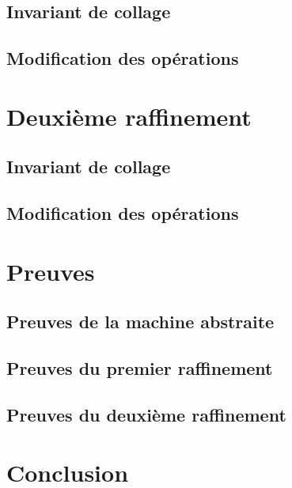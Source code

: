 \documentclass[12pt]{article}
\begin{document}
\subsection{Invariant de collage}
\subsection{Modification des opérations}
\newpage
\section{Deuxième raffinement}
\subsection{Invariant de collage}
\subsection{Modification des opérations}
\section{Preuves}
\subsection{Preuves de la machine abstraite}
\subsection{Preuves du premier raffinement}
\subsection{Preuves du deuxième raffinement}
\newpage
\section{Conclusion}
\end{document}
